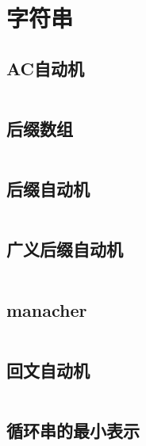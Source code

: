 \chapter{字符串}
\section{AC自动机}
\inputminted{cpp}{\source/string/Aho-Corasick-automaton.cpp}
\section{后缀数组}
\inputminted{cpp}{\source/string/suffix-array.cpp}
\section{后缀自动机}
\inputminted{cpp}{\source/string/suffix-automaton.cpp}
\section{广义后缀自动机}
\inputminted{cpp}{\source/string/ex-suffix-automaton.cpp}
\section{manacher}
\inputminted{cpp}{\source/string/Manacher.cpp}
\section{回文自动机}
\inputminted{cpp}{\source/string/palindromic-tree.cpp}
\section{循环串的最小表示}
\inputminted{cpp}{\source/string/minexpress.cpp}
